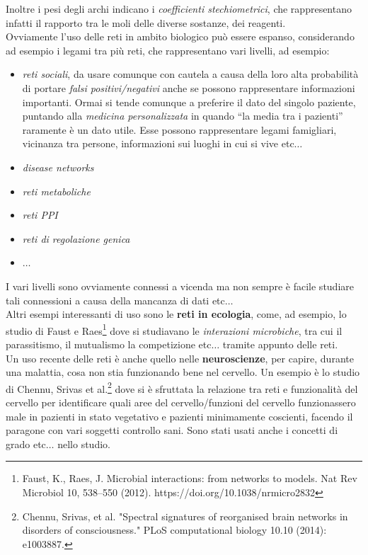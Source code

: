 \documentclass[a4paper,12pt, oneside]{book}
\begin{document}
Inoltre i pesi degli archi indicano i \textit{coefficienti stechiometrici}, che
rappresentano infatti il rapporto tra le moli delle diverse sostanze, dei
reagenti.  \\
Ovviamente l'uso delle reti in ambito biologico può essere espanso, considerando
ad esempio i legami tra più reti, che rappresentano vari livelli, ad esempio:
\begin{itemize}
  \item \textit{reti sociali}, da usare comunque con cautela a causa della loro
  alta probabilità di portare \textit{falsi positivi/negativi} anche se possono
  rappresentare informazioni importanti. Ormai si tende comunque a preferire il
  dato del singolo paziente, puntando alla \textit{medicina personalizzata} in
  quando ``la media tra i pazienti'' raramente è un dato utile. Esse
  possono rappresentare legami 
  famigliari, vicinanza tra persone, informazioni sui luoghi in cui si vive
  etc$\ldots$ 
  \item \textit{disease networks}
  \item \textit{reti metaboliche}
  \item \textit{reti PPI}
  \item \textit{reti di regolazione genica}
  \item $\ldots$
\end{itemize}
I vari livelli sono ovviamente connessi a vicenda ma non sempre è facile
studiare tali connessioni a causa della mancanza di dati etc$\ldots$\\
Altri esempi interessanti di uso sono le \textbf{reti in ecologia}, come, ad
esempio, lo 
studio di Faust e Raes\footnote{Faust, K., Raes, J. Microbial interactions: from
  networks to models. Nat Rev Microbiol 10, 538–550
  (2012). https://doi.org/10.1038/nrmicro2832} dove si studiavano le
\textit{interazioni microbiche}, tra cui il parassitismo, il mutualismo la
competizione etc$\ldots$ tramite appunto delle reti.\\
Un uso recente delle reti è anche quello nelle \textbf{neuroscienze}, per
capire, durante una malattia, cosa non stia funzionando bene nel cervello. Un
esempio è lo studio di Chennu, Srivas et al.\footnote{Chennu, Srivas, et
  al. "Spectral 
  signatures of reorganised brain networks in disorders of consciousness." PLoS
  computational biology 10.10 (2014): e1003887.} dove si è sfruttata la
relazione tra reti e funzionalità del cervello per identificare quali aree del
cervello/funzioni del cervello funzionassero male in pazienti in stato
vegetativo e pazienti 
minimamente coscienti, facendo il paragone con vari soggetti controllo
sani. Sono stati usati anche i concetti di grado etc$\ldots$ nello studio.
\end{document}
